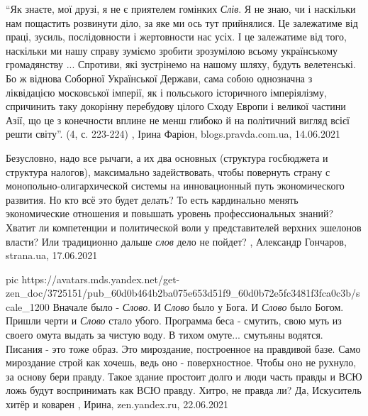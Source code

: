 \enquote{Як знаєте, мої друзі, я не є приятелем гомінких \emph{Слів}. Я не
знаю, чи і наскільки нам пощастить розвинути діло, за яке ми ось тут
прийнялися. Це залежатиме від праці, зусиль, послідовности і жертовности нас
усіх. І це залежатиме від того, наскільки ми нашу справу зуміємо зробити
зрозумілою всьому українському громадянству ...  Спротиви, які зустрінемо на
нашому шляху, будуть велетенські. Бо ж віднова Соборної Української Держави,
сама собою однозначна з ліквідацією московської імперії, як і польського
історичного імперіялізму, спричинить таку докорінну перебудову цілого Сходу
Европи і великої частини Азії, що це з конечности вплине не менш глибоко й на
політичний вигляд всієї решти світу}. (4, с.  223-224)
, 
Ірина Фаріон, blogs.pravda.com.ua, 14.06.2021

Безусловно, надо все рычаги, а их два основных (структура госбюджета и
структура налогов), максимально задействовать, чтобы повернуть страну с
монопольно-олигархической системы на инновационный путь экономического
развития.  Но кто всё это будет делать? То есть кардинально менять
экономические отношения и повышать уровень профессиональных знаний? Хватит ли
компетенции и политической воли у представителей верхних эшелонов власти?  Или
традиционно дальше \emph{слов} дело не пойдет?
, 
Александр Гончаров, strana.ua, 17.06.2021

\ifcmt
  pic https://avatars.mds.yandex.net/get-zen_doc/3725151/pub_60d0b464b2ba075e653d51f9_60d0b72e5fc3481f3fca0c3b/scale_1200
\fi
Вначале было - \emph{Слово}. И \emph{Слово} было у Бога. И \emph{Слово} было Богом.  Пришли черти и
\emph{Слово} стало убого. Программа беса - смутить, свою муть из своего омута выдать
за чистую воду. В тихом омуте... смутьяны водятся.  Писания - это тоже образ.
Это мироздание, построенное на правдивой базе. Само мироздание строй как
хочешь, ведь оно - поверхностное. Чтобы оно не рухнуло, за основу бери правду.
Такое здание простоит долго и люди часть правды и ВСЮ ложь будут воспринимать
как ВСЮ правду. Хитро, не правда ли? Да, Искуситель хитёр и коварен
, 
Ирина, zen.yandex.ru, 22.06.2021

